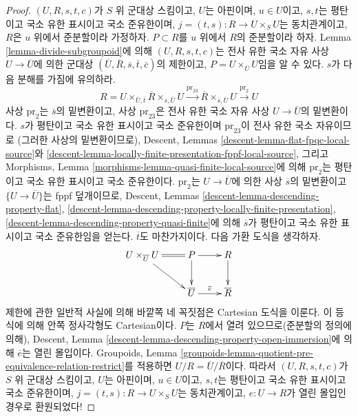 \begin{proof}
\medskip\noindent
$(U, R, s, t, c)$가 $S$ 위 군대상 스킴이고, $U$는 아핀이며,
$u \in U$이고, $s, t$는 평탄이고 국소 유한 표시이고 국소 준유한이며,
$j = (t, s) : R \to U \times_S U$는 동치관계이고,
$R$은 $u$ 위에서 준분할이라 가정하자.
$P \subset R$를 $u$ 위에서 $R$의 준분할이라 하자.
Lemma \ref{lemma-divide-subgroupoid}에 의해
$(U, R, s, t, c)$는 전사 유한 국소 자유 사상
$U \to \overline{U}$에 의한 군대상
$(\overline{U}, \overline{R}, \overline{s}, \overline{t}, \overline{c})$의
제한이고,
$P = U \times_{\overline{U}} U$임을 알 수 있다.
$s$가 다음 분해를 가짐에 유의하라.
$$
R = U \times_{\overline{U}, \overline{t}} \overline{R}
\times_{\overline{s}, \overline{U}} U
\xrightarrow{\text{pr}_{23}}
\overline{R} \times_{\overline{s}, \overline{U}} U
\xrightarrow{\text{pr}_2} U
$$
사상 $\text{pr}_2$는 $\overline{s}$의 밑변환이고,
사상 $\text{pr}_{23}$은 전사 유한 국소 자유 사상
$U \to \overline{U}$의 밑변환이다.
$s$가 평탄이고 국소 유한 표시이고 국소 준유한이며
$\text{pr}_{23}$이 전사 유한 국소 자유이므로
(그러한 사상의 밑변환이므로), Descent, Lemmas
\ref{descent-lemma-flat-fpqc-local-source}와
\ref{descent-lemma-locally-finite-presentation-fppf-local-source},
그리고 Morphisms, Lemma
\ref{morphisms-lemma-quasi-finite-local-source}에 의해
$\text{pr}_2$는 평탄이고 국소 유한 표시이고 국소 준유한이다.
$\text{pr}_2$는 $U \to \overline{U}$에 의한 사상 $\overline{s}$의
밑변환이고 $\{U \to \overline{U}\}$는 fppf 덮개이므로,
Descent, Lemmas \ref{descent-lemma-descending-property-flat},
\ref{descent-lemma-descending-property-locally-finite-presentation},
\ref{descent-lemma-descending-property-quasi-finite}에 의해
$\overline{s}$가 평탄이고 국소 유한 표시이고 국소 준유한임을 얻는다.
$\overline{t}$도 마찬가지이다. 다음 가환 도식을 생각하자.
$$
\xymatrix{
U \times_{\overline{U}} U \ar@{=}[r] \ar[rd] & P \ar[r] \ar[d] & R \ar[d] \\
& \overline{U} \ar[r]^{\overline{e}} & \overline{R}
}
$$
제한에 관한 일반적 사실에 의해 바깥쪽 네 꼭짓점은 Cartesian 도식을
이룬다. 이 등식에 의해 안쪽 정사각형도 Cartesian이다.
$P$는 $R$에서 열려 있으므로(준분할의 정의에 의해),
Descent, Lemma \ref{descent-lemma-descending-property-open-immersion}에
의해 $\overline{e}$는 열린 몰입이다.
Groupoids,
Lemma \ref{groupoids-lemma-quotient-pre-equivalence-relation-restrict}를
적용하면 $U/R = \overline{U}/\overline{R}$이다.
따라서 $(U, R, s, t, c)$가 $S$ 위 군대상 스킴이고,
$U$는 아핀이며, $u \in U$이고, $s, t$는 평탄이고 국소 유한 표시이고
국소 준유한이며, $j = (t, s) : R \to U \times_S U$는 동치관계이고,
$e : U \to R$가 열린 몰입인 경우로 환원되었다!


\end{proof}
